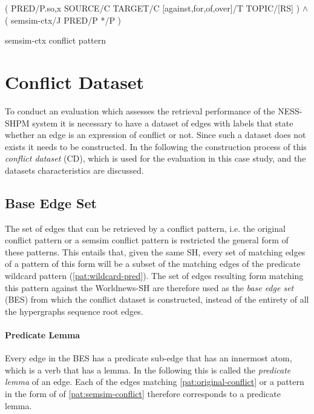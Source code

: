 \documentclass[11pt]{scrreprt}
\begin{document}
\begin{pattern}[H]
  \normalfont\sffamily
  \centering
  ( PRED/P.{so,x} SOURCE/C TARGET/C [against,for,of,over]/T TOPIC/[RS] ) \(\wedge\)\\ 
  ( semsim-ctx/J PRED/P */P )
  \caption{semsim-ctx conflict pattern}
  \label{pat:semsim-ctx-conflict}
\end{pattern}



\section{Conflict Dataset}
\label{sec:conflict-dataset}
To conduct an evaluation which assesses the retrieval performance of the NESS-SHPM system it is necessary to have a dataset of edges with labels that state whether an edge is an expression of conflict or not. Since such a dataset does not exists it needs to be constructed. In the following the construction process of this \textit{conflict dataset} (CD), which is used for the evaluation in this case study, and the datasets characteristics are discussed.


\subsection{Base Edge Set}
\label{sec:base-edge-set}
The set of edges that can be retrieved by a conflict pattern, i.e. the original conflict pattern or a semsim conflict pattern is restricted the general form of these patterns. This entails that, given the same SH, every set of matching edges of a pattern of this form will be a subset of the matching edges of the predicate wildcard pattern (\cref{pat:wildcard-pred}). The set of edges resulting form matching this pattern against the Worldnews-SH are therefore used as the \textit{base edge set} (BES) from which the conflict dataset is constructed, instead of the entirety of all the hypergraphs sequence root edges.

\paragraph{Predicate Lemma} Every edge in the BES has a predicate sub-edge that has an innermost atom, which is a verb that has a lemma. In the following this is called the \textit{predicate lemma} of an edge. Each of the edges matching \cref{pat:original-conflict} or a pattern in the form of of \cref{pat:semsim-conflict} therefore corresponds to a predicate lemma.
\end{document}
